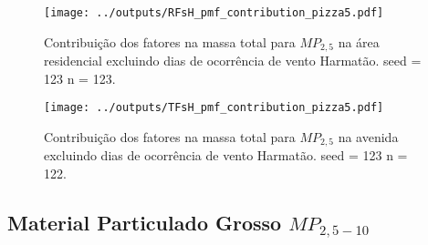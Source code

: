 \begin{landscape}
  \begin{figure}
    \centering
    \begin{minipage}[b]{0.45\linewidth}
      \texttt{[image: ../outputs/RFsH\_pmf\_contribution\_pizza5.pdf]}
      \caption{Contribuição dos fatores na massa total para $MP_{2,5}$ na área
               residencial excluindo dias de ocorrência de vento Harmatão. seed = 123 n = 123.
               \label{fig:RFsH_contribution5}}
    \end{minipage}%
    \hspace{0.5cm}
    \begin{minipage}[b]{0.45\linewidth}
      
    \end{minipage}
  \end{figure}
\end{landscape}

\begin{landscape}
  \begin{figure}
    \centering
    \begin{minipage}[b]{0.45\linewidth}
      \texttt{[image: ../outputs/TFsH\_pmf\_contribution\_pizza5.pdf]}
      \caption{Contribuição dos fatores na massa total para $MP_{2,5}$ na avenida
               excluindo dias de ocorrência de vento Harmatão. seed = 123 n = 122.
               \label{fig:TFsH_contribution5}}
    \end{minipage}%
    \hspace{0.5cm}
    \begin{minipage}[b]{0.45\linewidth}
      
    \end{minipage}
  \end{figure}
\end{landscape}

%
%
 
\subsection{Material Particulado Grosso $MP_{2,5-10}$}

